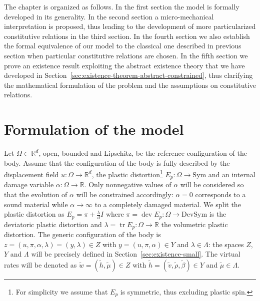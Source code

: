 \documentclass[a4paper,10pt,twoside]{amsbook}
\numberwithin{section}{chapter}
\numberwithin{equation}{chapter}
\theoremstyle{definition}
\DeclareMathOperator{\dev}{dev}
\DeclareMathOperator{\tr}{tr}
\begin{document}
The chapter is organized as follows. In the first section the model is formally developed in its generality. In the second section a micro-mechanical interpretation is proposed, thus leading to the development of more particularized constitutive relations in the third section. In the fourth section we also establish the formal equivalence of our model to the classical one described in previous section when particular constitutive relations are chosen. In the fifth section we prove an existence result exploiting the abstract existence theory that we have developed in Section~\ref{sec:existence-theorem-abstract-constrained}, thus clarifying the mathematical formulation of the problem and the assumptions on constitutive relations.

\section{Formulation of the model}

Let $\Omega\subset\mathbb{R}^d$, open, bounded and Lipschitz, be the reference configuration of the body. Assume that the configuration of the body is fully described by the displacement field $u\colon\Omega\to\mathbb{R}^d$, the plastic distortion\footnote{For simplicity we assume that $E_p$ is symmetric, thus excluding plastic spin.} $E_p\colon\Omega\to\text{Sym}$ and an internal damage variable $\alpha\colon\Omega\to\mathbb{R}$. Only nonnegative values of $\alpha$ will be considered so that the evolution of $\alpha$ will be constrained accordingly: $\alpha=0$ corresponds to a sound material while $\alpha\to\infty$ to a completely damaged material. We split the plastic distortion as $E_p=\pi+\frac{\lambda}{d}I$ where $\pi=\dev E_p\colon\Omega\to\text{DevSym}$ is the deviatoric plastic distortion and $\lambda=\tr E_p\colon\Omega\to\mathbb{R}$ the volumetric plastic distortion. The generic configuration of the body is $z=(u,\pi,\alpha,\lambda)=(y,\lambda)\in Z$ with $y=(u,\pi,\alpha)\in Y$ and $\lambda\in\Lambda$: the spaces $Z$, $Y$ and $\Lambda$ will be precisely defined in Section~\ref{sec:existence-small}. The virtual rates will be denoted as $\tilde w=(\tilde h,\tilde\mu)\in Z$ with $\tilde h=(\tilde v,\tilde\rho,\tilde\beta)\in Y$ and $\tilde\mu\in\Lambda$.
\end{document}
